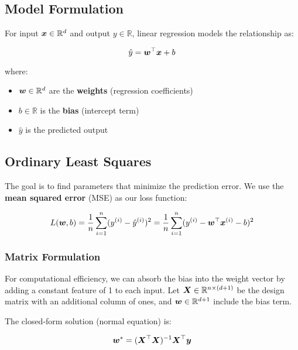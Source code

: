 \subsection{Model Formulation}

For input $\boldsymbol{x} \in \mathbb{R}^d$ and output $y \in \mathbb{R}$, linear regression models the relationship as:

\begin{equation}
\hat{y} = \boldsymbol{w}^\top \boldsymbol{x} + b
\end{equation}

where:
\begin{itemize}
    \item $\boldsymbol{w} \in \mathbb{R}^d$ are the \textbf{weights} (regression coefficients)
    \item $b \in \mathbb{R}$ is the \textbf{bias} (intercept term)
    \item $\hat{y}$ is the predicted output
\end{itemize}

\subsection{Ordinary Least Squares}

The goal is to find parameters that minimize the prediction error. We use the \textbf{mean squared error} (MSE) as our loss function:

\begin{equation}
L(\boldsymbol{w}, b) = \frac{1}{n} \sum_{i=1}^{n} (y^{(i)} - \hat{y}^{(i)})^2 = \frac{1}{n} \sum_{i=1}^{n} (y^{(i)} - \boldsymbol{w}^\top \boldsymbol{x}^{(i)} - b)^2
\end{equation}

\subsubsection{Matrix Formulation}

For computational efficiency, we can absorb the bias into the weight vector by adding a constant feature of 1 to each input. Let $\boldsymbol{X} \in \mathbb{R}^{n \times (d+1)}$ be the design matrix with an additional column of ones, and $\boldsymbol{w} \in \mathbb{R}^{d+1}$ include the bias term.

The closed-form solution (normal equation) is:

\begin{equation}
\boldsymbol{w}^* = (\boldsymbol{X}^\top \boldsymbol{X})^{-1} \boldsymbol{X}^\top \boldsymbol{y}
\end{equation}

